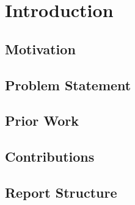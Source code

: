 \section{Introduction}
\label{sec:intro}


\subsection{Motivation}

\subsection{Problem Statement}

\subsection{Prior Work}

\subsection{Contributions}

\subsection{Report Structure}
